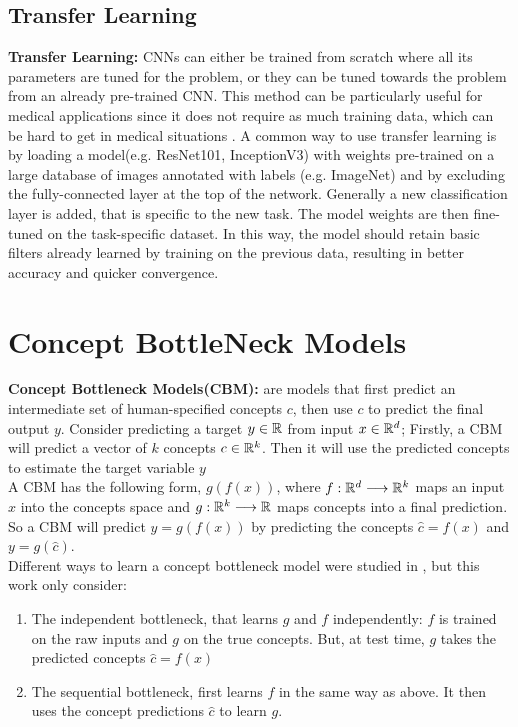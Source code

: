 \subsection{Transfer Learning}
\textbf{Transfer Learning:}
CNNs can either be trained from scratch where all its parameters are tuned for the problem, or they can be tuned towards the problem from an already pre-trained CNN. This method can be particularly useful for medical applications since it does not require as much training data, which can be hard to get in medical situations \cite{TransferLearningMedicalBackground}. 
A common way to use transfer learning is by loading a model(e.g. ResNet101, InceptionV3) with weights pre-trained on a large database of images annotated with labels (e.g. ImageNet\cite{ImageNet}) and by excluding the fully-connected layer at the top of the network. Generally a new classification layer is added, that is specific to the new task. The model weights are then fine-tuned on the task-specific dataset. In this way, the model should retain basic filters already learned by training on the previous data, resulting in better accuracy and quicker convergence.
\\
\section{Concept BottleNeck Models} \label{sectionCBM}
\textbf{Concept Bottleneck Models(CBM):} are models that first predict an intermediate set of human-specified concepts $c$, then use $c$ to predict the final output $y$\cite{CBM}.
Consider predicting a target $y\in\mathbb{R}$ from input $x\in\mathbb{R}^d$; Firstly, a CBM will predict a vector of $k$ concepts $c\in\mathbb{R}^k$. Then it will use the predicted concepts to estimate the target variable $y$\\
A CBM has the following form, $g(f(x))$, where $f:\mathbb{R}^d \longrightarrow \mathbb{R}^k$ maps an input $x$ into the concepts space and $g:\mathbb{R}^k \longrightarrow \mathbb{R}$ maps concepts into a final prediction. So a CBM will predict $\hat{y}=g(f(x))$ by predicting the concepts $\hat{c}=f(x)$ and $y=g(\hat{c})$. \\
Different ways to learn a concept bottleneck model were studied in \cite{CBM}, but this work only consider:
\begin{enumerate}
    \item The independent bottleneck, that learns ${g}$ and ${f}$ independently: $f$ is trained on the raw inputs and $g$ on the true concepts. But, at test time, ${g}$ takes the predicted concepts $\hat{c}={f}(x)$ 
    \item The sequential bottleneck, first learns ${f}$ in the same way as above. It then uses the concept predictions $\hat{c}$ to learn ${g}$.
\end{enumerate}

